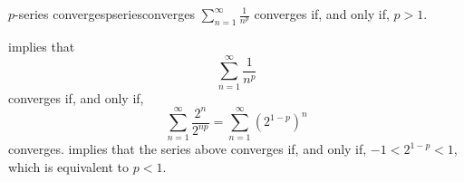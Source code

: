 \begin{thm}{\(p\)-series converges}{pseriesconverges}
	\(\sum_{n = 1}^{\infty} \frac{1}{n^p}\) converges if, and only if, \(p > 1\).
\end{thm}

\begin{dem}{}{}
	 implies that \[
		\sum_{n=1}^\infty \frac{1}{n^p}
	\]
	converges if, and only if, \[
		\sum_{n=1}^\infty \frac{2^n}{2^{np}} = \sum_{n=1}^\infty \left(2^{1-p}\right)^{n} 
	\]
	converges.  implies that the series above converges if, and only if, \(-1 < 2^{1-p} < 1\), which is equivalent to  \(p < 1\).
\end{dem}
